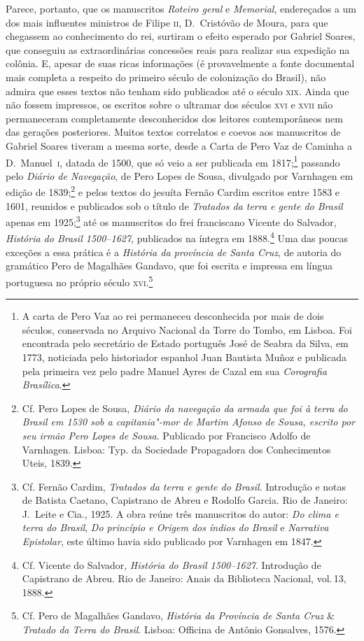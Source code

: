 \documentclass[12pt]{extarticle}
\begin{document}
Parece, portanto, que os manuscritos \textit{Roteiro geral} e
\textit{Memorial}, endereçados a um dos mais influentes ministros de
Filipe 	\textsc{ii}, D.~Cristóvão de Moura, para que chegassem ao conhecimento do
rei, surtiram o efeito esperado por Gabriel Soares, que conseguiu as
extraordinárias concessões reais para realizar sua expedição na
colônia. E, apesar de suas ricas informações (é provavelmente a fonte
documental mais completa a respeito do primeiro século de colonização
do Brasil), não admira que esses textos não tenham sido publicados até
o século \textsc{xix}. Ainda que não fossem impressos, os escritos sobre o
ultramar dos séculos \textsc{xvi} e \textsc{xvii} não permaneceram completamente
desconhecidos dos leitores contemporâneos nem das gerações posteriores.
Muitos textos correlatos e coevos aos manuscritos de Gabriel Soares
tiveram a mesma sorte, desde a Carta de Pero Vaz de Caminha a D.~Manuel~\textsc{i}, 
datada de 1500, que só veio a ser publicada em 1817;\footnote{A
carta de Pero Vaz ao rei permaneceu desconhecida por mais de dois
séculos, conservada no Arquivo Nacional da Torre do Tombo, em Lisboa.
Foi encontrada pelo secretário de Estado português José de Seabra da
Silva, em 1773, noticiada pelo historiador espanhol Juan Bautista Muñoz
e publicada pela primeira vez pelo padre Manuel Ayres de Cazal em sua
\textit{Corografia Brasílica}.} passando pelo
\textit{Diário de Navegação}, de Pero Lopes de Sousa, divulgado por
Varnhagen em edição de 1839;\footnote{ Cf. Pero Lopes de Sousa, \textit{Diário da navegação da armada que 
foi à terra do Brasil em 1530 sob a capitania"-mor de Martim Afonso de Sousa,
escrito por seu irmão Pero Lopes de Sousa}. Publicado por Francisco Adolfo de Varnhagen. 
Lisboa: Typ. da Sociedade Propagadora dos Conhecimentos Uteis, 1839.} e pelos textos do jesuíta Fernão Cardim
escritos entre 1583 e 1601, reunidos e publicados 
sob o título de \textit{Tratados da terra e gente do Brasil} apenas em
1925;\footnote{ Cf. Fernão Cardim, \textit{Tratados da terra e gente do Brasil}. 
Introdução e notas de Batista Caetano, Capistrano de Abreu e Rodolfo Garcia. 
Rio de Janeiro: J.~Leite e Cia., 1925. 
A obra reúne três manuscritos do autor: \textit{Do clima e terra do Brasil}, \textit{Do princípio e Origem dos índios do Brasil}
e \textit{Narrativa Epistolar}, este último havia sido publicado por Varnhagen em 1847.} até os manuscritos do frei franciscano Vicente do Salvador,
\textit{História do Brasil 1500--1627}, publicados na íntegra em 1888.\footnote{ Cf. Vicente do Salvador, \textit{História do Brasil 1500--1627}.
Introdução de Capistrano de Abreu. Rio de Janeiro: Anais da Biblioteca Nacional, vol.\,13, 1888.}
Uma das poucas exceções a essa prática é a \textit{História da
província de Santa Cruz}, de autoria do gramático Pero de
Magalhães Gandavo, que foi escrita e impressa em língua portuguesa no
próprio século \textsc{xvi}.\footnote{ Cf. Pero de Magalhães Gandavo,
\textit{História da Província de Santa Cruz} \& \textit{Tratado da
Terra do Brasil}. Lisboa: Officina de Antônio Gonsalves, 1576.}
\end{document}
